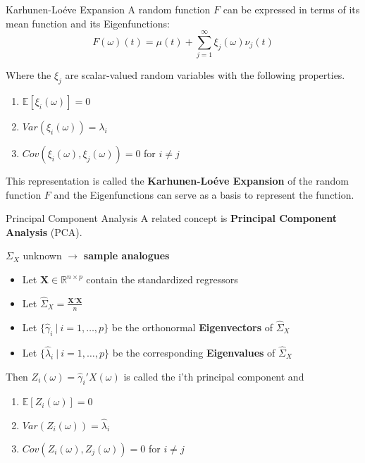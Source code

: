 \documentclass{beamer}
\begin{document}
	\begin{frame}{Karhunen-Lo\'{e}ve Expansion}
		A random function $F$ can be expressed in terms of its mean function and its Eigenfunctions:
		$$F(\omega)(t) = \mu(t) + \sum_{j = 1}^{\infty} \xi_j(\omega) \nu_j(t)$$
		
		Where the $\xi_j$ are scalar-valued random variables with the following properties.
		\begin{multicols}{2}
			\begin{enumerate}
				\item $\mathbb{E}[\xi_i(\omega)] = 0$
				\item $Var(\xi_i(\omega)) = \lambda_i$
				\item $Cov(\xi_i(\omega), \xi_j(\omega)) = 0$ for $i \neq j$
			\end{enumerate}
		\end{multicols}
		
		This representation is called the \textbf{Karhunen-Lo\'{e}ve Expansion} of the random function $F$ and the Eigenfunctions can serve as a basis to represent the function.
	\end{frame}

	\begin{frame}{Principal Component Analysis}
		A related concept is \textbf{Principal Component Analysis} (PCA).
		\vspace{0.2cm}
		
		$\Sigma_X$ unknown $\rightarrow$ \textbf{sample analogues}
	
		\begin{itemize}
			\item Let $\mathbf{X} \in \mathbb{R}^{n \times p}$ contain the standardized regressors
			\item Let $\hat{\Sigma}_X = \frac{\mathbf{X}'\mathbf{X}}{n}$
			\item Let $\{\hat{\gamma}_i \: \vert \: i = 1, \dots, p\}$ be the orthonormal \textbf{Eigenvectors} of $\hat{\Sigma}_X$
			\item Let $\{\hat{\lambda}_i \: \vert \: i = 1, \dots, p\}$ be the corresponding \textbf{Eigenvalues} of $\hat{\Sigma}_X$
		\end{itemize}
		\vspace{0.2cm} 
		
		Then $Z_i(\omega) = \hat{\gamma}_i' X(\omega)$ is called the i'th principal component and
		\begin{multicols}{2}
			\begin{enumerate}
				\item $\mathbb{E}[Z_i(\omega)] = 0$
				\item $Var(Z_i(\omega)) = \hat{\lambda}_i$
				\item $Cov(Z_i(\omega), Z_j(\omega)) = 0$ for $i \neq j$
			\end{enumerate}
		\end{multicols}
	\end{frame}
\end{document}
